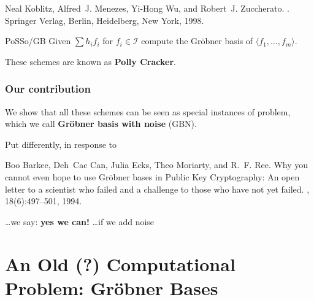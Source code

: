 \documentclass[10pt]{beamer}
\renewcommand{\emph}[1]{{\bf #1}}
\newcommand{\ideal}[1]{\langle {#1} \rangle}
\newcommand{\I}{\ensuremath{\mathcal{I}}\xspace}
\renewcommand{\emph}[1]{\textbf{#1}}
\begin{document}
\begin{frame}[allowframebreaks]
\begin{thebibliography}{Gen09}
Neal Koblitz, Alfred~J. Menezes, Yi-Hong Wu, and Robert~J. Zuccherato.
.
\newblock Springer Verlag, Berlin, Heidelberg, New York, 1998.
\end{thebibliography}

\vspace{0.5cm}

\begin{block}{PoSSo/GB}
Given $\sum h_if_i$ for $f_i \in \I$ compute the Gröbner basis of $\ideal{f_1,\dots,f_m}$.
\end{block}

\vspace{0.5cm}

These schemes are known as {\bf Polly Cracker}.

\end{frame}

\begin{frame}
\frametitle{Our contribution} 

We show that all these schemes can be seen as special instances of problem, which we call \emph{Gröbner basis with noise} (GBN).

\vspace{1em}

Put differently, in response to

\vspace{2em}

\begin{thebibliography}{}
Boo Barkee, Deh~Cac Can, Julia Ecks, Theo Moriarty, and R.~F. Ree.
\newblock Why you cannot even hope to use {G}r{\"o}bner bases in {P}ublic {K}ey
  {C}ryptography: An open letter to a scientist who failed and a challenge to
  those who have not yet failed.
, 18(6):497--501, 1994.
\end{thebibliography}

\vspace{2em}

\begin{flushright}
\dots we say: {\bf yes we can!} \dots if we add noise 
\end{flushright}

\end{frame}


\section{An Old (?) Computational Problem: Gröbner Bases}
\end{document}
